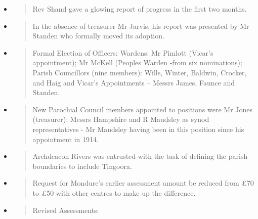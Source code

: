 \begin{itemize}
\item
  \begin{quote}
  Rev Shand gave a glowing report of progress in the first two months.
  \end{quote}
\item
  \begin{quote}
  In the absence of treasurer Mr Jarvis, his report was presented by Mr
  Standen who formally moved its adoption.
  \end{quote}
\item
  \begin{quote}
  Formal Election of Officers: Wardens: Mr Pimlott (Vicar's
  appointment); Mr McKell (Peoples Warden -from six nominations); Parish
  Councillors (nine members): Wills, Winter, Baldwin, Crocker, and Haig
  and Vicar's Appointments -- Messrs James, Faunce and Standen.
  \end{quote}
\item
  \begin{quote}
  New Parochial Council members appointed to positions were Mr Jones
  (treasurer); Messrs Hampshire and R Maudsley as synod representatives
  - Mr Maudsley having been in this position since his appointment in
  1914.
  \end{quote}
\item
  \begin{quote}
  Archdeacon Rivers was entrusted with the task of defining the parish
  boundaries to include Tingoora.
  \end{quote}
\item
  \begin{quote}
  Request for Mondure's earlier assessment amount be reduced from \pounds70 to
  \pounds50 with other centres to make up the difference.
  \end{quote}
\item
  \begin{quote}
  Revised Assessments:
  \end{quote}


\end{itemize}
